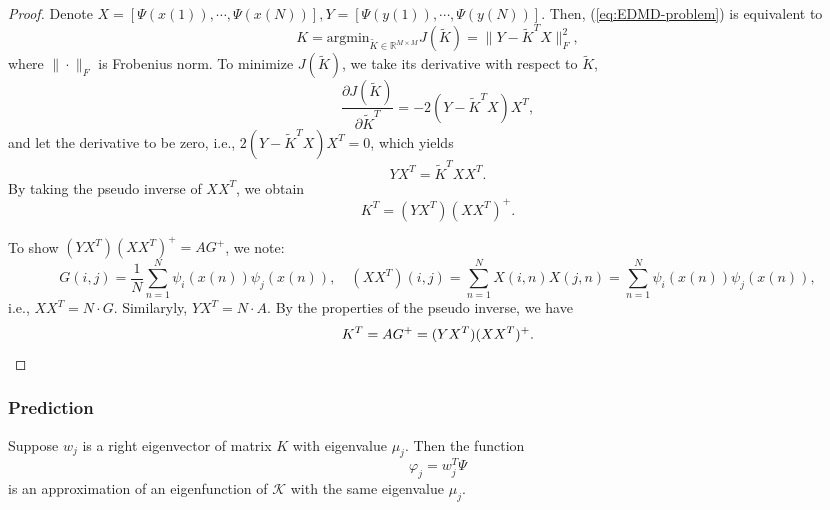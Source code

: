 \begin{proof}
  Denote $X = [\Psi(x(1)),\cdots,\Psi(x(N))], Y =
  [\Psi(y(1)),\cdots,\Psi(y(N))]$.
  Then, (\ref{eq:EDMD-problem}) is equivalent to
  \begin{equation*}
    K = \text{argmin}_{\tilde{K} \in \mathbb{R}^{M \times M}} J(\tilde{K})
    = \|Y - \tilde{K}^TX\|_F^2,
  \end{equation*}
  where $\|\cdot\|_F$ is Frobenius norm.
  To minimize $J(\tilde{K})$, we take its derivative with respect to $\tilde{K}$,
  \begin{equation*}
    \frac{\partial J(\tilde{K})}{\partial \tilde{K}^T}
    = - 2(Y - \tilde{K}^TX)X^T,
  \end{equation*}
  and let the derivative to be zero, i.e.,
  $2(Y-\tilde{K}^TX)X^T = 0$,
  which yields
  \begin{equation*}
    YX^T = \tilde{K}^TXX^T.
  \end{equation*}
  By taking the pseudo inverse of $XX^T$,
  we obtain
  \begin{equation*}
    K^T = (YX^T)(XX^T)^+.
  \end{equation*}

  To show $(YX^T)(XX^T)^+ = AG^+$,
  we note:
  \begin{equation*}
    G(i,j) = \frac{1}{N} \sum\limits_{n = 1}^N \psi_i(x(n))\psi_j(x(n)), \quad
    (XX^T)(i,j) = \sum\limits_{n = 1}^N X(i,n)X(j,n) = \sum\limits_{n = 1}^N \psi_i(x(n))\psi_j(x(n)),
  \end{equation*}
  i.e., $XX^T = N \cdot G$.
  Similaryly, $YX^T = N \cdot A$.
  By the properties of the pseudo inverse,
  we have
  \begin{equation*}
    K^T = AG^+ = (YX^T)(XX^T)^+. \qedhere
  \end{equation*}
\end{proof}

\subsubsection{Prediction}


\begin{proposition}
  Suppose $w_j$ is a right eigenvector of matrix $K$ with eigenvalue $\mu_j$.
  Then the function
  \begin{equation}
    \label{eq:expression-of-eigenfunction}
    \varphi_j = w_j^T \Psi
  \end{equation}
  is an approximation of an eigenfunction of $\mathcal{K}$
  with the same eigenvalue $\mu_j$.
\end{proposition}

